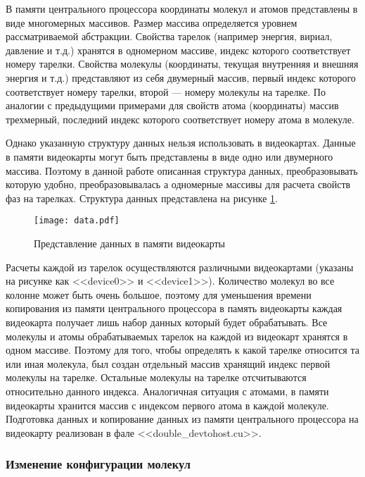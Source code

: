 В памяти центрального процессора координаты молекул и атомов представлены в виде многомерных массивов. Размер массива определяется уровнем рассматриваемой абстракции. Свойства тарелок (например энергия, вириал, давление и т.д.) хранятся в одномерном массиве, индекс которого соответствует номеру тарелки. Свойства молекулы (координаты, текущая внутренняя и внешняя энергия и т.д.) представляют из себя двумерный массив, первый индекс которого соответствует номеру тарелки, второй --- номеру молекулы на тарелке. По аналогии с предыдущими примерами для свойств атома (координаты) массив трехмерный, последний индекс которого соответствует номеру атома в молекуле.

Однако указанную структуру данных нельзя использовать в видеокартах. Данные в памяти видеокарты могут быть представлены в виде одно или двумерного массива. Поэтому в данной работе описанная структура данных, преобразовывать которую удобно, преобразовывалась а одномерные массивы для расчета свойств фаз на тарелках. Структура данных представлена на рисунке \ref{fig:data_sheme}.

\begin{figure}
	\begin{center}
		\texttt{[image: data.pdf]}
	\end{center}
	\caption{Представление данных в памяти видеокарты} \label{fig:data_sheme}
\end{figure}

Расчеты каждой из тарелок осуществляются различными видеокартами (указаны на рисунке как <<device0>> и  <<device1>>). Количество молекул во все колонне может быть очень большое, поэтому для уменьшения времени копирования из памяти центрального процессора в память видеокарты каждая видеокарта получает лишь набор данных который будет обрабатывать. Все молекулы и атомы обрабатываемых тарелок на каждой из видеокарт хранятся в одном массиве. Поэтому для того, чтобы определять к какой тарелке относится та или иная молекула, был создан отдельный массив хранящий индекс первой молекулы на тарелке. Остальные молекулы на тарелке отсчитываются относительно данного индекса. Аналогичная ситуация с атомами, в памяти видеокарты хранится массив с индексом первого атома в каждой молекуле. Подготовка данных и копирование данных из памяти центрального процессора на видеокарту реализован в фале <<double\_devtohost.cu>>.

\subsubsection{Изменение конфигурации молекул}

